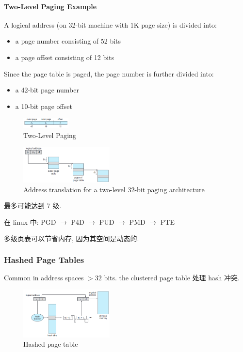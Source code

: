 \paragraph{Two-Level Paging Example}A logical address (on 32-bit machine with 1K page size) is divided into:
\begin{itemize}
    \item a page number consisting of 52 bits
    \item a page offset consisting of 12 bits
\end{itemize}

Since the page table is paged, the page number is further divided into:
\begin{itemize}
    \item a 42-bit page number
    \item a 10-bit page offset
\end{itemize}

\begin{figure}[!htb]
    \centering
    \includegraphics[width=0.22\textwidth]{pic/OS8/Two-Level Paging}
    \caption{Two-Level Paging}
\end{figure}

\begin{figure}[!htb]
    \centering
    \includegraphics[width=0.42\textwidth]{pic/OS8/Address translation for a two-level 32-bit paging architecture}
    \caption{Address translation for a two-level 32-bit paging architecture}
\end{figure}

最多可能达到 7 级. 

在 linux 中: PGD $\to$ P4D $\to$ PUD $\to$ PMD $\to$ PTE

多级页表可以节省内存, 因为其空间是动态的. 


\subsubsection{Hashed Page Tables}
Common in address spaces $> 32$ bits. the clustered page table 处理 hash 冲突. 

\begin{figure}[!htb]
    \centering
    \includegraphics[width=0.42\textwidth]{pic/OS8/Hashed page table}
    \caption{Hashed page table}
\end{figure}

